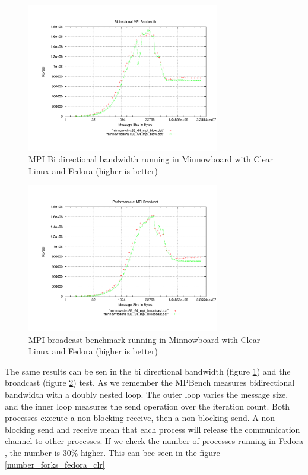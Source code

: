 \begin{figure}[H]
\centering
\includegraphics[width=0.75\textwidth]{images/mpbench_clr_experiments/mpi_bibw.pdf}
\caption{MPI Bi directional bandwidth running in Minnowboard with Clear Linux
and Fedora (higher is better)}
\label{mpi_bibw_clr_fedora}
\end{figure}


\begin{figure}[H]
\centering
\includegraphics[width=0.75\textwidth]{images/mpbench_clr_experiments/mpi_broadcast.pdf}
\caption{MPI broadcast benchmark running in Minnowboard with Clear Linux and
Fedora (higher is better)}
\label{mpi_broadcast_clr_fedora}
\end{figure}

The same results can be sen in the bi directional bandwidth (figure
\ref{mpi_bibw_clr_fedora}) and the broadcast (figure
\ref{mpi_broadcast_clr_fedora}) test. As we remember the MPBench measures
bidirectional bandwidth with a doubly nested loop. The outer loop varies the
message size, and the inner loop measures the send operation over the iteration
count. Both processes execute a non-blocking receive, then a non-blocking send.
A non blocking send and receive mean that each process will release the
communication channel to other processes. If we check the number of processes
running in Fedora , the number is 30\% higher. This can bee seen in the figure
\ref{number_forks_fedora_clr}


